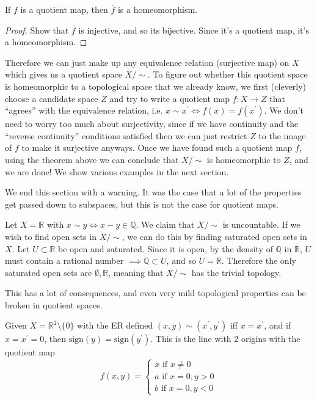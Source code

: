   \begin{corollary}
    If $f$ is a quotient map, then $\bar{f}$ is a homeomorphism. 
  \end{corollary}
  \begin{proof}
    Show that $\bar{f}$ is injective, and so its bijective. Since it's a quotient map, it's a homeomorphism. 
  \end{proof}

  Therefore we can just make up any equivalence relation (surjective map) on $X$ which gives us a quotient space $X/{\sim}$. To figure out whether this quotient space is homeomorphic to a topological space that we already know, we first (cleverly) choose a candidate space $Z$ and try to write a quotient map $f: X \rightarrow Z$ that ``agrees'' with the equivalence relation, i.e. $x \sim x^\prime \iff f(x) = f(x^\prime)$. We don't need to worry too much about surjectivity, since if we have continuity and the ``reverse continuity'' conditions satisfied then we can just restrict $Z$ to the image of $f$ to make it surjective anyways. Once we have found such a quotient map $f$, using the theorem above we can conclude that $X/{\sim}$ is homeomorphic to $Z$, and we are done! We show various examples in the next section. 

  We end this section with a warning. It was the case that a lot of the properties get passed down to subspaces, but this is not the case for quotient maps. 

  \begin{example}
    \label{quotient_trivial}
    Let $X = \mathbb{R}$ with $x \sim y \iff x - y \in \mathbb{Q}$. We claim that $X/{\sim}$ is uncountable. If we wish to find open sets in $X/{\sim}$, we can do this by finding saturated open sets in $X$. Let $U \subset \mathbb{R}$ be open and saturated. Since it is open, by the density of $\mathbb{Q}$ in $\mathbb{R}$, $U$ must contain a rational number $\implies \mathbb{Q} \subset U$, and so $U = \mathbb{R}$. Therefore the only saturated open sets are $\emptyset, \mathbb{R}$, meaning that $X/{\sim}$ has the trivial topology. 
  \end{example}

  This has a lot of consequences, and even very mild topological properties can be broken in quotient spaces.  

  \begin{example}
    \label{quotient_hausdorff}
    Given $X = \mathbb{R}^2 \setminus \{0\}$ with the ER defined $(x, y) \sim (x^\prime, y^\prime)$ iff $x = x^\prime$, and if $x = x^\prime = 0$, then $\mathrm{sign}(y) = \mathrm{sign}(y^\prime)$. This is the line with 2 origins with the quotient map 
    \begin{equation}
      f(x, y) = \begin{cases} 
        x \text{ if } x \neq 0 \\
        a \text{ if } x = 0, y > 0 \\ 
        b \text{ if } x = 0, y < 0
      \end{cases}
    \end{equation}
  \end{example}

